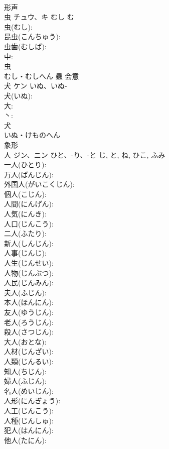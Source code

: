 \documentclass[8pt]{extreport}
\begin{document}
\begin{CJK}{UTF8}{min}
\\	形声 
\\	虫	チュウ、キ	むし	む	
\\	虫(むし): 
\\	昆虫(こんちゅう): 
\\	虫歯(むしば): 
\\	中: 
\\	虫	
\\	むし・むしへん	蟲	会意 
\\	犬	ケン	いぬ、いぬ-		
\\	犬(いぬ): 
\\	大: 
\\	丶: 
\\	犬	
\\	いぬ・けものへん	
\\	象形 
\\	人	ジン、ニン	ひと、-り、-と	じ, と, ね, ひこ, ふみ	
\\	一人(ひとり): 
\\	万人(ばんじん): 
\\	外国人(がいこくじん): 
\\	個人(こじん): 
\\	人間(にんげん): 
\\	人気(にんき): 
\\	人口(じんこう): 
\\	二人(ふたり): 
\\	新人(しんじん): 
\\	人事(じんじ): 
\\	人生(じんせい): 
\\	人物(じんぶつ): 
\\	人民(じんみん): 
\\	夫人(ふじん): 
\\	本人(ほんにん): 
\\	友人(ゆうじん): 
\\	老人(ろうじん): 
\\	殺人(さつじん): 
\\	大人(おとな): 
\\	人材(じんざい): 
\\	人類(じんるい): 
\\	知人(ちじん): 
\\	婦人(ふじん): 
\\	名人(めいじん): 
\\	人形(にんぎょう): 
\\	人工(じんこう): 
\\	人種(じんしゅ): 
\\	犯人(はんにん): 
\\	他人(たにん): 

\end{CJK}
\end{document}
